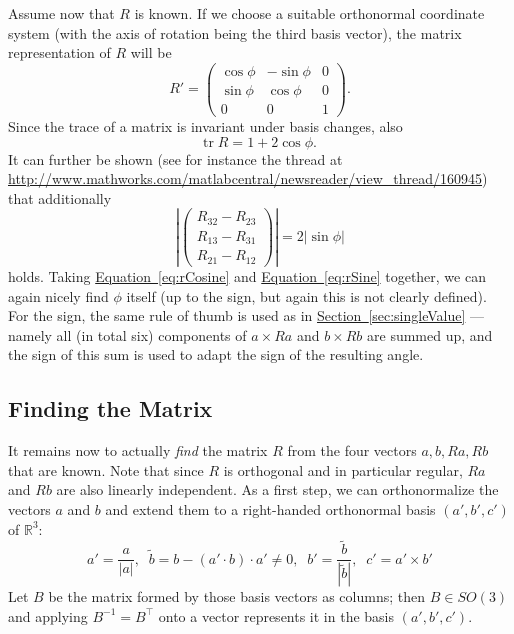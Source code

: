 \documentclass{article}
\newcommand{\abs}[1]{\ensuremath{\left| #1 \right|}}
\newcommand{\inner}[2]{\ensuremath{#1 \cdot #2}}
\newcommand{\cross}[2]{\ensuremath{#1 \times #2}}
\newcommand{\trace}[0]{\ensuremath{\text{tr} \;}}
\newcommand{\R}[0]{\ensuremath{\mathbb{R}}}
\newcommand{\Rthree}[0]{\ensuremath{\R^3}}
\newcommand{\SO}[1]{\ensuremath{SO\left(#1\right)}}
\renewcommand{\eqref}[1]{\hyperref[eq:#1]{Equation~\ref*{eq:#1}}}
\newcommand{\secref}[1]{\hyperref[sec:#1]{Section~\ref*{sec:#1}}}
\begin{document}
Assume now that $R$ is known.  If we choose a suitable orthonormal
coordinate system (with the axis of rotation being the third basis vector),
the matrix representation of $R$ will be
\begin{equation*}
R' = \left(\begin{array}{ccc}
       \cos \phi & -\sin \phi & 0 \\
       \sin \phi & \cos \phi & 0 \\
       0 & 0 & 1
     \end{array}\right).
\end{equation*}
Since the trace of a matrix is invariant under basis changes, also
\begin{equation}
\label{eq:rCosine}
\trace R = 1 + 2 \cos \phi.
\end{equation}
It can further be shown (see for instance the thread at
\url{http://www.mathworks.com/matlabcentral/newsreader/view_thread/160945})
that additionally
\begin{equation}
\label{eq:rSine}
\abs{\left(\begin{array}{c}
  R_{32} - R_{23} \\
  R_{13} - R_{31} \\
  R_{21} - R_{12}
\end{array}\right)} = 2 \abs {\sin \phi}
\end{equation}
holds.
Taking \eqref{rCosine} and \eqref{rSine} together, we can again nicely find
$\phi$ itself (up to the sign, but again this is not clearly defined).  For
the sign, the same rule of thumb is used as in \secref{singleValue} --- namely
all (in total six) components of $\cross{a}{Ra}$ and $\cross{b}{Rb}$
are summed up, and the sign of this sum is used to adapt the sign of the
resulting angle.

\subsection{Finding the Matrix}

It remains now to actually \emph{find} the matrix $R$ from the four
vectors $a, b, Ra, Rb$ that are known.  Note that since $R$ is orthogonal
and in particular regular, $Ra$ and $Rb$ are also linearly independent.
As a first step, we can orthonormalize the vectors $a$ and $b$ and extend
them to a right-handed orthonormal basis $(a', b', c')$ of $\Rthree$:
\begin{equation}
\label{eq:abcBasis}
a' = \frac{a}{\abs{a}}, \;\;
\tilde{b} = b - (\inner{a'}b) \cdot a' \ne 0, \;\;
b' = \frac{\tilde{b}}{\abs{\tilde{b}}}, \;\;
c' = \cross{a'}{b'}
\end{equation}
Let $B$ be the matrix formed by those basis vectors as columns; then
$B \in \SO3$ and applying $B^{-1} = B^\top$ onto a vector represents it
in the basis $(a', b', c')$.
\end{document}
